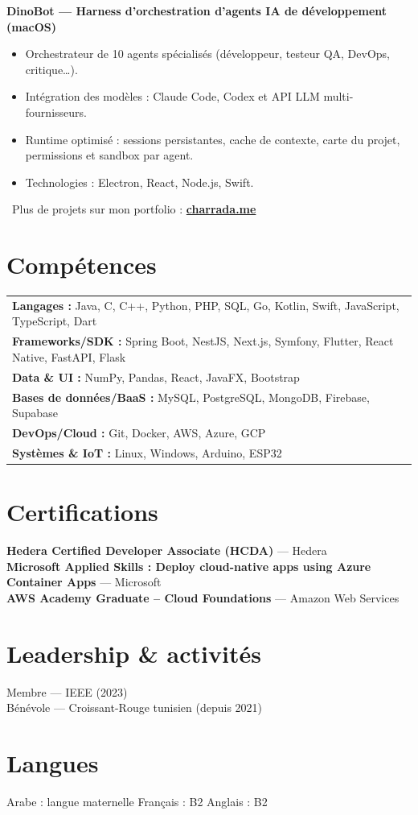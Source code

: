 \documentclass[10.5pt,a4paper]{article}
\newcommand{\project}[1]{\needspace{5\baselineskip}\noindent\textbf{#1}\par\vspace{2pt}}
\begin{document}
\vspace{3pt}
\project{DinoBot — Harness d’orchestration d’agents IA de développement (macOS)}
\begin{itemize}
  \item Orchestrateur de 10 agents spécialisés (développeur, testeur QA, DevOps, critique…).
  \item Intégration des modèles : Claude Code, Codex et API LLM multi-fournisseurs.
  \item Runtime optimisé : sessions persistantes, cache de contexte, carte du projet, permissions et sandbox par agent.
  \item Technologies : Electron, React, Node.js, Swift.
\end{itemize}
\vspace{2pt}
\noindent\faGlobe\ Plus de projets sur mon portfolio : \href{https://www.charrada.me}{\textbf{charrada.me}}

\section*{Compétences}
\begin{tabular}{@{\hspace{0.6em}}l}
  \textbf{Langages :} Java, C, C++, Python, PHP, SQL, Go, Kotlin, Swift, JavaScript, TypeScript, Dart\\
  \textbf{Frameworks/SDK :} Spring Boot, NestJS, Next.js, Symfony, Flutter, React Native, FastAPI, Flask\\
  \textbf{Data \& UI :} NumPy, Pandas, React, JavaFX, Bootstrap\\
  \textbf{Bases de données/BaaS :} MySQL, PostgreSQL, MongoDB, Firebase, Supabase\\
  \textbf{DevOps/Cloud :} Git, Docker, AWS, Azure, GCP\\
  \textbf{Systèmes \& IoT :} Linux, Windows, Arduino, ESP32
\end{tabular}

\section*{Certifications}
\textbf{Hedera Certified Developer Associate (HCDA)} — Hedera\\
\textbf{Microsoft Applied Skills : Deploy cloud-native apps using Azure Container Apps} — Microsoft\\
\textbf{AWS Academy Graduate – Cloud Foundations} — Amazon Web Services

\section*{Leadership \& activités}
Membre — IEEE (2023)\\
Bénévole — Croissant-Rouge tunisien (depuis 2021)

\section*{Langues}
Arabe : langue maternelle \quad Français : B2 \quad Anglais : B2
\end{document}
